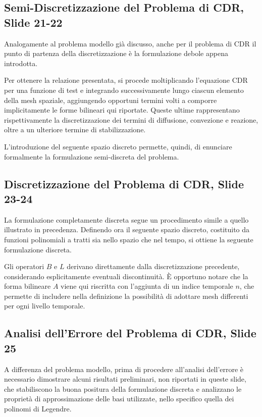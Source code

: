 \documentclass[12pt]{article}
\begin{document}
    \subsection{Semi-Discretizzazione del Problema di CDR, Slide 21-22}

    Analogamente al problema modello già discusso, anche per il problema di CDR il punto di partenza della discretizzazione è la formulazione debole appena introdotta.

    Per ottenere la relazione presentata, si procede moltiplicando l'equazione CDR per una funzione di test e integrando successivamente lungo ciascun elemento della mesh spaziale, aggiungendo opportuni termini volti a comporre implicitamente le forme bilineari qui riportate. Queste ultime rappresentano rispettivamente la discretizzazione dei termini di diffusione, convezione e reazione, oltre a un ulteriore termine di stabilizzazione.

    L'introduzione del seguente spazio discreto permette, quindi, di enunciare formalmente la formulazione semi-discreta del problema.

    \subsection{Discretizzazione del Problema di CDR, Slide 23-24}

    La formulazione completamente discreta segue un procedimento simile a quello illustrato in precedenza. Definendo ora il seguente spazio discreto, costituito da funzioni polinomiali a tratti sia nello spazio che nel tempo, si ottiene la seguente formulazione discreta.

    Gli operatori $B$ e $L$ derivano direttamente dalla discretizzazione precedente, considerando esplicitamente eventuali discontinuità. È opportuno notare che la forma bilineare $A$ viene qui riscritta con l'aggiunta di un indice temporale $n$, che permette di includere nella definizione la possibilità di adottare mesh differenti per ogni livello temporale.

    \subsection{Analisi dell'Errore del Problema di CDR, Slide 25}

    A differenza del problema modello, prima di procedere all'analisi dell'errore è necessario dimostrare alcuni risultati preliminari, non riportati in queste slide, che stabiliscono la buona positura della formulazione discreta e analizzano le proprietà di approssimazione delle basi utilizzate, nello specifico quella dei polinomi di Legendre.
\end{document}
